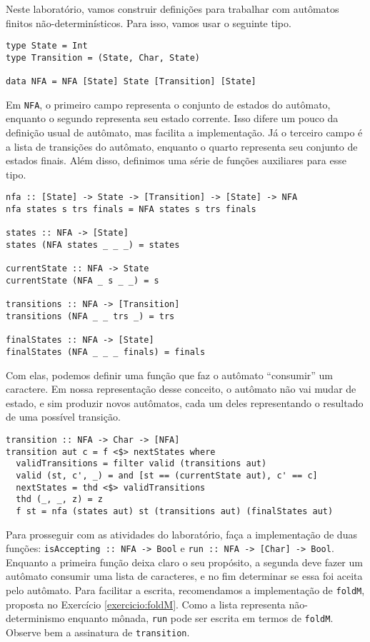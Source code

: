 \documentclass[a4paper]{article}
\begin{document}
Neste laboratório, vamos construir definições para trabalhar com autômatos finitos
não-determinísticos.
Para isso, vamos usar o seguinte tipo.

\begin{verbatim}
type State = Int
type Transition = (State, Char, State)

data NFA = NFA [State] State [Transition] [State]
\end{verbatim}

Em \texttt{NFA}, o primeiro campo representa o conjunto de estados do autômato,
enquanto o segundo representa seu estado corrente.
Isso difere um pouco da definição usual de autômato, mas facilita a
implementação.
Já o terceiro campo é a lista de transições do autômato, enquanto o quarto
representa seu conjunto de estados finais.
Além disso, definimos uma série de funções auxiliares para esse tipo.

\pagebreak

\begin{verbatim}
nfa :: [State] -> State -> [Transition] -> [State] -> NFA
nfa states s trs finals = NFA states s trs finals

states :: NFA -> [State]
states (NFA states _ _ _) = states

currentState :: NFA -> State
currentState (NFA _ s _ _) = s

transitions :: NFA -> [Transition]
transitions (NFA _ _ trs _) = trs

finalStates :: NFA -> [State]
finalStates (NFA _ _ _ finals) = finals
\end{verbatim}

Com elas, podemos definir uma função que faz o autômato ``consumir'' um
caractere.
Em nossa representação desse conceito, o autômato não vai mudar de estado, e sim
produzir novos autômatos, cada um deles representando o resultado de uma
possível transição.

\begin{verbatim}
transition :: NFA -> Char -> [NFA]
transition aut c = f <$> nextStates where
  validTransitions = filter valid (transitions aut)
  valid (st, c', _) = and [st == (currentState aut), c' == c]
  nextStates = thd <$> validTransitions
  thd (_, _, z) = z
  f st = nfa (states aut) st (transitions aut) (finalStates aut)
\end{verbatim}

Para prosseguir com as atividades do laboratório, faça a implementação de duas
funções: \mbox{\texttt{isAccepting :: NFA -> Bool}} e \texttt{run :: NFA -> [Char] -> Bool}.
Enquanto a primeira função deixa claro o seu propósito, a segunda deve fazer um
autômato consumir uma lista de caracteres, e no fim determinar se essa foi
aceita pelo autômato.
Para facilitar a escrita, recomendamos a implementação de \texttt{foldM},
proposta no Exercício \ref{exercicio:foldM}.
Como a lista representa não-determinismo enquanto mônada, \texttt{run} pode ser
escrita em termos de \texttt{foldM}.
Observe bem a assinatura de \texttt{transition}.
\end{document}
